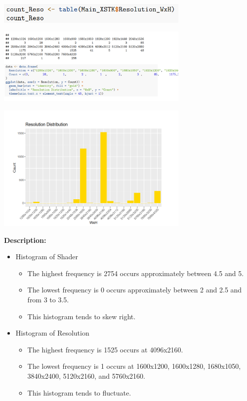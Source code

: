 \begin{center}
    \includegraphics[width=0.7\textwidth]{res.png}
\end{center}
\begin{center}
    \includegraphics[width=0.7\textwidth]{res1.png}
\end{center}
\begin{center}
    \includegraphics[width=0.7\textwidth]{res2.png}
\end{center}

\textbf{Description:}
\begin{itemize}
    \item Histogram of Shader
    \begin{itemize}
        \item The highest frequency is 2754 occurs approximately between 4.5 and 5.
        \item The lowest frequency is 0 occurs approximately between 2 and 2.5 and from 3 to 3.5.
        \item This histogram tends to skew right.
    \end{itemize}

    \item Histogram of Resolution
    \begin{itemize}
        \item The highest frequency is 1525 occurs at 4096x2160.
        \item The lowest frequency is 1 occurs at 1600x1200, 1600x1280, 1680x1050, 3840x2400, 5120x2160, and 5760x2160.
        \item  This histogram tends to fluctuate.
    \end{itemize}
\end{itemize}


